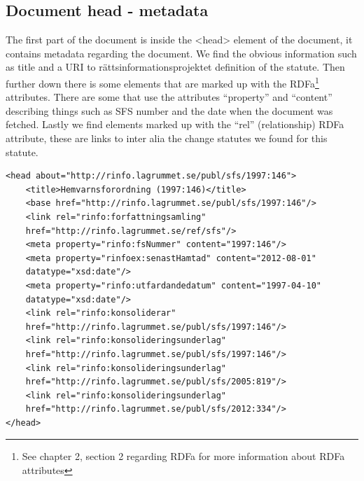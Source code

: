 \subsection{Document head - metadata}
The first part of the document is inside the <head> element of the document, it contains metadata regarding the document. We find the obvious information such as title and a URI to rättsinformationsprojektet definition of the statute. Then further down there is some elements that are marked up with the RDFa\footnote{See chapter 2, section 2 regarding RDFa for more information about RDFa attributes} attributes. There are some that use the attributes “property” and “content” describing things such as SFS number and the date when the document was fetched. Lastly we find elements marked up with the “rel” (relationship) RDFa attribute, these are links to inter alia the change statutes we found for this statute.\\
\begin{verbatim}
<head about="http://rinfo.lagrummet.se/publ/sfs/1997:146">
    <title>Hemvarnsforordning (1997:146)</title>
    <base href="http://rinfo.lagrummet.se/publ/sfs/1997:146"/>
    <link rel="rinfo:forfattningsamling" 
	href="http://rinfo.lagrummet.se/ref/sfs"/>
    <meta property="rinfo:fsNummer" content="1997:146"/>
    <meta property="rinfoex:senastHamtad" content="2012-08-01" 
	datatype="xsd:date"/>
    <meta property="rinfo:utfardandedatum" content="1997-04-10" 
	datatype="xsd:date"/>
    <link rel="rinfo:konsoliderar" 
	href="http://rinfo.lagrummet.se/publ/sfs/1997:146"/>
    <link rel="rinfo:konsolideringsunderlag" 
	href="http://rinfo.lagrummet.se/publ/sfs/1997:146"/>
    <link rel="rinfo:konsolideringsunderlag" 
	href="http://rinfo.lagrummet.se/publ/sfs/2005:819"/>
    <link rel="rinfo:konsolideringsunderlag" 
	href="http://rinfo.lagrummet.se/publ/sfs/2012:334"/>
</head>
\end{verbatim}
\linebreak
\newline


